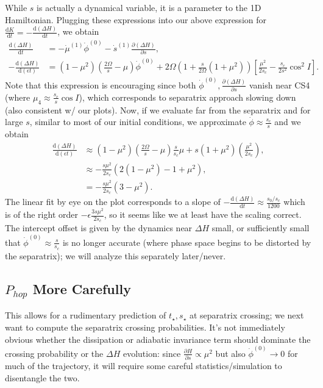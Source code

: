 \documentclass[11pt,
        usenames, %
        dvipsnames %
    ]{article}
\newcommand*{\rd}[2]{\frac{\mathrm{d}#1}{\mathrm{d}#2}}
\newcommand*{\pd}[2]{\frac{\partial#1}{\partial#2}}
\newcommand*{\p}[1]{\left(#1\right)}
\newcommand*{\s}[1]{\left[#1\right]}
\begin{document}
While $s$ is actually a dynamical variable, it is a parameter to the 1D
Hamiltonian. Plugging these expressions into our above expression for $\rd{K}{t}
= -\rd{(\Delta H)}{t}$, we obtain
\begin{align}
    \rd{(\Delta H)}{t} &= -\dot{\mu}^{(1)}\dot{\phi}^{(0)} - \dot{s}^{(1)}
            \pd{(\Delta H)}{s},\\
    -\rd{(\Delta H)}{(\epsilon t)} &= (1 - \mu^2)\p{\frac{2\Omega}{s} - \mu}
            \dot{\phi}^{(0)} + 2\Omega\p{1 + \frac{s}{2\Omega}(1 + \mu^2)}
            \s{\frac{\mu^2}{2s_c} - \frac{s_c}{2s^2}\cos^2 I}.
\end{align}
Note that this expression is encouraging since both $\dot{\phi}^{(0)},
\pd{\p{\Delta H}}{s}$ vanish near CS4 (where $\mu_4 \approx \frac{s_c}{s}\cos
I$), which corresponds to separatrix approach slowing down (also consistent w/
our plots). Now, if we evaluate far from the separatrix and for large $s$,
similar to most of our initial conditions, we approximate $\dot{\phi} \approx
\frac{s_c}{s}$ and we obtain
\begin{align}
    \rd{(\Delta H)}{(\epsilon t)} &\approx
            \p{1 - \mu^2}\p{\frac{2\Omega}{s} - \mu}\frac{s}{s_c}\mu
                + s\p{1 + \mu^2}\p{\frac{\mu^2}{2s_c}},\nonumber\\
        &\approx -\frac{s\mu^2}{2s_c} \p{2(1 - \mu^2) - 1 + \mu^2}
            ,\nonumber\\
        &= -\frac{s\mu^2}{2s_c}\p{3 - \mu^2}.
\end{align}
The linear fit by eye on the plot corresponds to a slope of $-\rd{(\Delta H)}{t}
\approx \frac{s_0/s_c}{1200}$ which is of the right order $-\epsilon
\frac{3s\mu^2}{2s_c}$, so it seems like we at least have the scaling correct.
The intercept offset is given by the dynamics near $\Delta H$ small, or
sufficiently small that $\dot{\phi}^{(0)} \approx \frac{s}{s_c}$ is no longer
accurate (where phase space begins to be distorted by the separatrix); we will
analyze this separately later/never.

\subsection{$P_{hop}$ More Carefully}

This allows for a rudimentary prediction of $t_{\star}, s_{\star}$ at separatrix
crossing; we next want to compute the separatrix crossing probabilities. It's
not immediately obvious whether the dissipation or adiabatic invariance term
should dominate the crossing probability or the $\Delta H$ evolution: since
$\pd{H}{s} \propto \mu^2$ but also $\dot{\phi}^{(0)} \to 0$ for much of the
trajectory, it will require some careful statistics/simulation to disentangle
the two.
\end{document}
